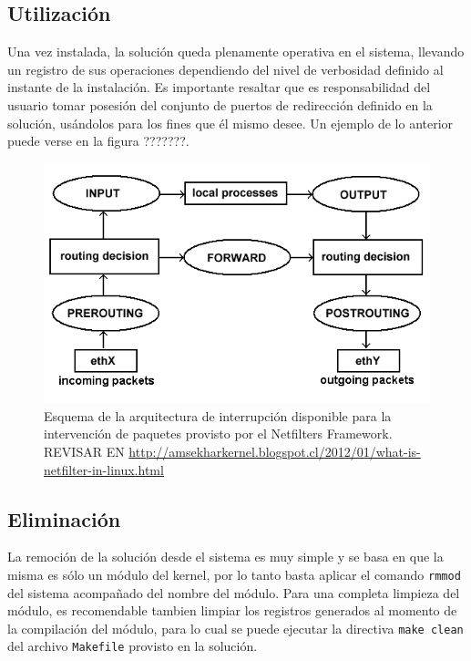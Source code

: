 \subsection{Utilización}
Una vez instalada, la solución queda plenamente operativa en el sistema, llevando un registro de sus operaciones dependiendo del nivel de verbosidad definido al instante de la instalación. Es importante resaltar que es responsabilidad del usuario tomar posesión del conjunto de puertos de redirección definido en la solución, usándolos para los fines que él mismo desee. Un ejemplo de lo anterior puede verse en la figura ???????.

\begin{figure}[!h]
	\centering
	\includegraphics[scale=.5]{imagenes/netfilterArchitecture}
	\caption{Esquema de la arquitectura de interrupción disponible para la intervención de paquetes provisto por el Netfilters Framework. REVISAR EN \url{http://amsekharkernel.blogspot.cl/2012/01/what-is-netfilter-in-linux.html}}
	\label{netfilterArchitecture}
\end{figure}

\subsection{Eliminación}
La remoción de la solución desde el sistema es muy simple y se basa en que la misma es sólo un módulo del kernel, por lo tanto basta aplicar el comando \verb=rmmod= del sistema acompañado del nombre del módulo. Para una completa limpieza del módulo, es recomendable tambien limpiar los registros generados al momento de la compilación del módulo, para lo cual se puede ejecutar la directiva \verb=make clean= del archivo \verb=Makefile= provisto en la solución.

